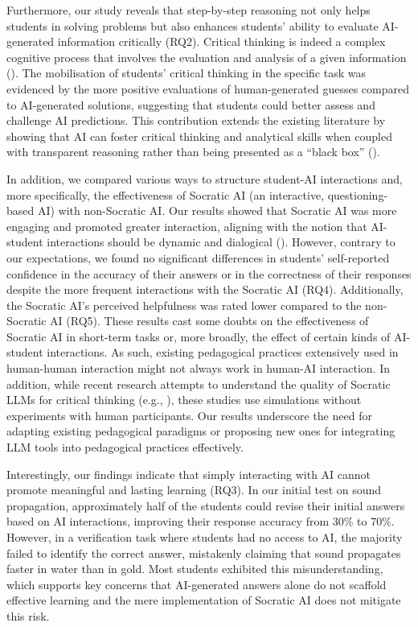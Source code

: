 \documentclass[
  12pt,
]{article}
\begin{document}
Furthermore, our study reveals that step-by-step reasoning not only helps students in solving problems but also enhances students' ability to evaluate AI-generated information critically (RQ2). Critical thinking is indeed a complex cognitive process that involves the evaluation and analysis of a given information (). The mobilisation of students' critical thinking in the specific task was evidenced by the more positive evaluations of human-generated guesses compared to AI-generated solutions, suggesting that students could better assess and challenge AI predictions. This contribution extends the existing literature by showing that AI can foster critical thinking and analytical skills when coupled with transparent reasoning rather than being presented as a ``black box'' ().

In addition, we compared various ways to structure student-AI interactions and, more specifically, the effectiveness of Socratic AI (an interactive, questioning-based AI) with non-Socratic AI. Our results showed that Socratic AI was more engaging and promoted greater interaction, aligning with the notion that AI-student interactions should be dynamic and dialogical (). However, contrary to our expectations, we found no significant differences in students' self-reported confidence in the accuracy of their answers or in the correctness of their responses despite the more frequent interactions with the Socratic AI (RQ4). Additionally, the Socratic AI's perceived helpfulness was rated lower compared to the non-Socratic AI (RQ5). These results cast some doubts on the effectiveness of Socratic AI in short-term tasks or, more broadly, the effect of certain kinds of AI-student interactions. As such, existing pedagogical practices extensively used in human-human interaction might not always work in human-AI interaction. In addition, while recent research attempts to understand the quality of Socratic LLMs for critical thinking (e.g., ), these studies use simulations without experiments with human participants. Our results underscore the need for adapting existing pedagogical paradigms or proposing new ones for integrating LLM tools into pedagogical practices effectively.

Interestingly, our findings indicate that simply interacting with AI cannot promote meaningful and lasting learning (RQ3). In our initial test on sound propagation, approximately half of the students could revise their initial answers based on AI interactions, improving their response accuracy from 30\% to 70\%. However, in a verification task where students had no access to AI, the majority failed to identify the correct answer, mistakenly claiming that sound propagates faster in water than in gold. Most students exhibited this misunderstanding, which supports key concerns that AI-generated answers alone do not scaffold effective learning and the mere implementation of Socratic AI does not mitigate this risk.
\end{document}
